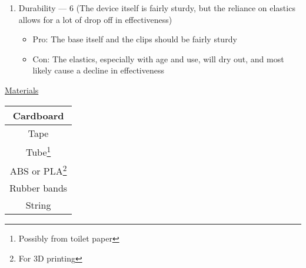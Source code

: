 \begin{enumerate}
\begin{itemize}
    \end{itemize}

  \item Durability — 6 (The device itself is fairly sturdy, but the reliance on elastics allows for a lot of drop off in effectiveness)

    \begin{itemize}

      \item Pro: The base itself and the clips should be fairly sturdy

      \item Con: The elastics, especially with age and use, will dry out, and most likely cause a decline in effectiveness

    \end{itemize}

\end{enumerate}

\begin{center}
  \underline{Materials} \\
  \vspace{10pt}
  \begin{tabular}{|c|}
    \hline
    Cardboard\\
    \hline
    Tape\\
    \hline
    Tube\footnote{Possibly from toilet paper}\\
    \hline
    ABS or PLA\footnote{For 3D printing}\\
    \hline
    Rubber bands\\
    \hline
    String\\
    \hline
  \end{tabular}

\end{center}



